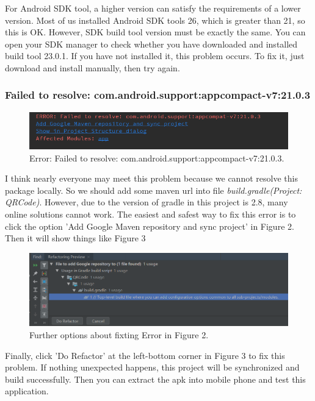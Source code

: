 \documentclass{article}
\begin{document}
For Android SDK tool, a higher version can satisfy the requirements of a lower version. Most of us installed Android SDK tools 26, which is greater than 21, so this is OK. However, SDK build tool version must be exactly the same. You can open your SDK manager to check whether you have downloaded and installed build tool 23.0.1. If you have not installed it, this problem occurs. To fix it, just download and install manually, then try again.

\subsubsection{Failed to resolve: com.android.support:appcompact-v7:21.0.3}
\begin{figure}[htbp]
     \centering
     \includegraphics[width=\linewidth]{error2.PNG}
     \caption{Error: Failed to resolve: com.android.support:appcompact-v7:21.0.3.}
\end{figure}
I think nearly everyone may meet this problem because we cannot resolve this package locally. So we should add some maven url into file \textit{build.gradle(Project: QRCode)}. However, due to the version of gradle in this project is 2.8, many online solutions cannot work. The easiest and safest way to fix this error is to click the option 'Add Google Maven repository and sync project' in Figure 2. Then it will show things like Figure 3
\begin{figure}[htbp]
     \centering
     \includegraphics[width=\linewidth]{error3.PNG}
     \caption{Further options about fixting Error in Figure 2.}
\end{figure}

Finally, click 'Do Refactor' at the left-bottom corner in Figure 3 to fix this problem. If nothing unexpected happens, this project will be synchronized and build successfully. Then you can extract the apk into mobile phone and test this application.
\end{document}
